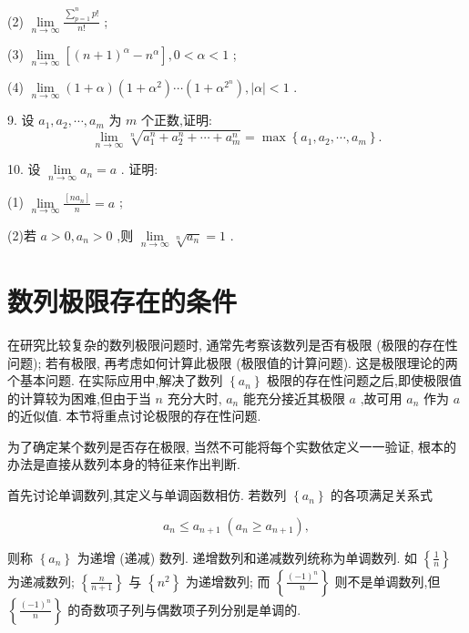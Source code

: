 (2) \(\mathop{\lim }\limits_{{n \rightarrow  \infty }}\frac{\mathop{\sum }\limits_{{p = 1}}^{n}p!}{n!}\) ;

(3) \(\mathop{\lim }\limits_{{n \rightarrow  \infty }}\left\lbrack  {{\left( n + 1\right) }^{\alpha } - {n}^{\alpha }}\right\rbrack  ,0 < \alpha  < 1\) ;

(4) \(\mathop{\lim }\limits_{{n \rightarrow  \infty }}\left( {1 + \alpha }\right) \left( {1 + {\alpha }^{2}}\right) \cdots \left( {1 + {\alpha }^{{2}^{n}}}\right) ,\left| \alpha \right|  < 1\) .

9. 设 \({a}_{1},{a}_{2},\cdots ,{a}_{m}\) 为 \(m\) 个正数,证明:
\[
\mathop{\lim }\limits_{{n \rightarrow  \infty }}\sqrt[n]{{a}_{1}^{n} + {a}_{2}^{n} + \cdots  + {a}_{m}^{n}} = \max \left\{  {{a}_{1},{a}_{2},\cdots ,{a}_{m}}\right\}  .
\]

10. 设 \(\mathop{\lim }\limits_{{n \rightarrow  \infty }}{a}_{n} = a\) . 证明:

(1) \(\mathop{\lim }\limits_{{n \rightarrow  \infty }}\frac{\left\lbrack  n{a}_{n}\right\rbrack  }{n} = a\) ;

(2)若 \(a > 0,{a}_{n} > 0\) ,则 \(\mathop{\lim }\limits_{{n \rightarrow  \infty }}\sqrt[n]{{a}_{n}} = 1\) .

\section{数列极限存在的条件}

在研究比较复杂的数列极限问题时, 通常先考察该数列是否有极限 (极限的存在性问题); 若有极限, 再考虑如何计算此极限 (极限值的计算问题). 这是极限理论的两个基本问题. 在实际应用中,解决了数列 \(\left\{  {a}_{n}\right\}\) 极限的存在性问题之后,即使极限值的计算较为困难,但由于当 \(n\) 充分大时, \({a}_{n}\) 能充分接近其极限 \(a\) ,故可用 \({a}_{n}\) 作为 \(a\) 的近似值. 本节将重点讨论极限的存在性问题.

为了确定某个数列是否存在极限, 当然不可能将每个实数依定义一一验证, 根本的办法是直接从数列本身的特征来作出判断.

首先讨论单调数列,其定义与单调函数相仿. 若数列 \(\left\{  {a}_{n}\right\}\) 的各项满足关系式

\[
{a}_{n} \leq  {a}_{n + 1}\;\left( {{a}_{n} \geq  {a}_{n + 1}}\right) ,
\]

则称 \(\left\{  {a}_{n}\right\}\) 为递增 (递减) 数列. 递增数列和递减数列统称为单调数列. 如 \(\left\{  \frac{1}{n}\right\}\) 为递减数列; \(\left\{  \frac{n}{n + 1}\right\}\) 与 \(\left\{  {n}^{2}\right\}\) 为递增数列; 而 \(\left\{  \frac{{\left( -1\right) }^{n}}{n}\right\}\) 则不是单调数列,但 \(\left\{  \frac{{\left( -1\right) }^{n}}{n}\right\}\) 的奇数项子列与偶数项子列分别是单调的.

